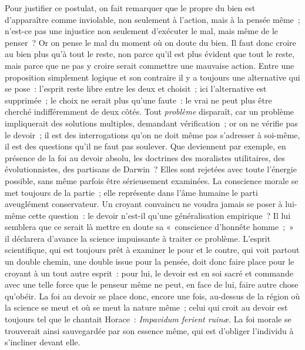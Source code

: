 \documentclass[french,twoside]{book} %
\begin{document}
Pour justifier ce postulat, on fait remarquer que le propre du bien est d’apparaître comme inviolable, non seulement à l’action, mais à la pensée même ; n’est-ce pas une injustice non seulement d’exécuter le mal, mais même de le penser ? Or on pense le mal du moment où on doute du bien. Il faut donc croire au bien plus qu’à tout le reste, non parce qu’il est plus évident que tout le reste, mais parce que ne pas y croire serait commettre une mauvaise action. Entre une proposition simplement logique et son contraire il y a toujours une alternative qui se pose : l’esprit reste libre entre les deux et choisit ; ici l’alternative est supprimée ; le choix ne serait plus qu’une faute : le vrai ne peut plus être cherché indifféremment de deux côtés. Tout \emph{problème} disparaît, car un problème impliquerait des solutions multiples, demandant vérification ; or on ne vérifie pas le devoir ; il est des interrogations qu’on ne doit même pas s’adresser à soi-même, il est des questions qu’il ne faut pas soulever. Que deviennent par exemple, en présence de la foi au devoir absolu, les doctrines des moralistes utilitaires, des évolutionnistes, des partisans de Darwin ? Elles sont rejetées avec toute l’énergie possible, sans même parfois être sérieusement examinées. La conscience morale se met toujours de la partie ; elle représente dans l’âme humaine le parti aveuglément conservateur. Un croyant convaincu ne voudra jamais se poser à lui-même cette question : le devoir n’est-il qu’une généralisation empirique ? Il lui semblera que ce serait là mettre en doute sa « conscience d’honnête homme ; » il déclarera d’avance la science impuissante à traiter ce problème. L’esprit scientifique, qui est toujours prêt à examiner le pour et le contre, qui voit partout un double chemin, une double issue pour la pensée, doit donc faire place pour le croyant à un tout autre esprit : pour lui, le devoir est en soi sacré et commande avec une telle force que le penseur même ne peut, en face de lui, faire autre chose qu’obéir. La foi au devoir se place donc, encore une fois, au-dessus de la région où la science se meut et où se meut la nature même ; celui qui croit au devoir est toujours tel que le chantait Horace : \emph{Impavidum ferient ruinæ}. La foi morale se trouverait ainsi sauvegardée par son essence même, qui est d’obliger l’individu à s’incliner devant elle.\par
\end{document}
